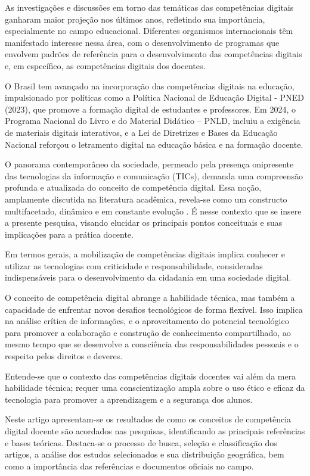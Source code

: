 \documentclass[portuguese]{textolivre}
\begin{document}
As investigações e discussões em torno das temáticas das competências
digitais ganharam maior projeção nos últimos anos, refletindo sua
importância, especialmente no campo educacional. Diferentes organismos
internacionais
\cite{ocde2011, europeancommission2018}
têm manifestado interesse nessa área, com o desenvolvimento de programas
que envolvem padrões de referência para o desenvolvimento das
competências digitais e, em específico, as competências digitais dos
docentes.

O Brasil tem avançado na incorporação das competências digitais na
educação, impulsionado por políticas como a Política Nacional de
Educação Digital - PNED (2023), que promove a formação digital de
estudantes e professores. Em 2024, o Programa Nacional do Livro e do
Material Didático -- PNLD, incluiu a exigência de materiais digitais
interativos, e a Lei de Diretrizes e Bases da Educação Nacional reforçou
o letramento digital na educação básica e na formação docente.

O panorama contemporâneo da sociedade, permeado pela presença
onipresente das tecnologias da informação e comunicação (TICs), demanda
uma compreensão profunda e atualizada do conceito de competência
digital. Essa noção, amplamente discutida na literatura acadêmica,
revela-se como um constructo multifacetado, dinâmico e em constante
evolução \cite{ferrari2013}. É nesse contexto que se insere a presente
pesquisa, visando elucidar os principais pontos conceituais e suas
implicações para a prática docente.

Em termos gerais, a mobilização de competências digitais implica
conhecer e utilizar as tecnologias com criticidade e responsabilidade,
consideradas indispensáveis para o desenvolvimento da cidadania em uma
sociedade digital.

O conceito de competência digital abrange a habilidade técnica, mas
também a capacidade de enfrentar novos desafios tecnológicos de forma
flexível. Isso implica na análise crítica de informações, e o
aproveitamento do potencial tecnológico para promover a colaboração e
construção de conhecimento compartilhado, ao mesmo tempo que se
desenvolve a consciência das responsabilidades pessoais e o respeito
pelos direitos e deveres.

Entende-se que o contexto das competências digitais docentes vai além da
mera habilidade técnica; requer uma conscientização ampla sobre o uso
ético e eficaz da tecnologia para promover a aprendizagem e a segurança
dos alunos.

Neste artigo apresentam-se os resultados de como os conceitos de
competência digital docente são acordados nas pesquisas, identificando
as principais referências e bases teóricas. Destaca-se o processo de
busca, seleção e classificação dos artigos, a análise dos estudos
selecionados e sua distribuição geográfica, bem como a importância das
referências e documentos oficiais no campo.
\end{document}
